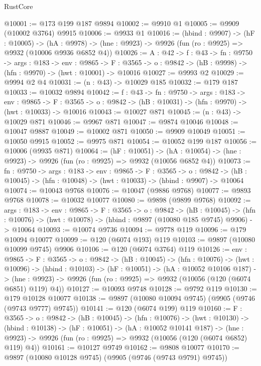 \begin{lexlean}{RustCore}
\begin{coremodule}
@10001 := @173 @199 @187 @9894
@10002 := @9910 @1
@10005 := @9909 (@10002 @3764) @9915
@10006 := @9933 @1
@10016 := (hbind : @9907) ->
  (hF : @10005) ->
  (hA : @9978) -> (hne : @9923) -> @9926 (fun (ro : @9925) => @9932 (@10006 @9936 @6852 @4))
@10026 := {A : @42} ->
  {f : @43} ->
  {fn : @9750} ->
  {args : @183} ->
  {env : @9865} ->
  {F : @3565} -> {o : @9842} -> (hB : @9998) -> (hfn : @9970) -> (hwt : @10001) -> @10016
@10027 := @9993 @2
@10029 := @9994 @2 @4
@10031 := (n : @43) -> @10029 @185
@10032 := @179 @187
@10033 := @10032 @9894
@10042 := {f : @43} ->
  {fn : @9750} ->
  {args : @183} ->
  {env : @9865} ->
  {F : @3565} -> {o : @9842} -> (hB : @10031) -> (hfn : @9970) -> (hwt : @10033) -> @10016
@10043 := @10027 @871
@10045 := (n : @43) -> @10029 @871
@10046 := @9967 @871
@10047 := @9874 @10046
@10048 := @10047 @9887
@10049 := @10002 @871
@10050 := @9909 @10049
@10051 := @10050 @9915
@10052 := @9975 @871
@10054 := @10052 @199 @187
@10056 := @10006 (@9935 @871)
@10064 := (hF : @10051) ->
  (hA : @10054) -> (hne : @9923) -> @9926 (fun (ro : @9925) => @9932 (@10056 @6852 @4))
@10073 := {fn : @9750} ->
  {args : @183} ->
  {env : @9865} ->
  {F : @3565} ->
  {o : @9842} -> (hB : @10045) -> (hfn : @10048) -> (hwt : @10033) -> (hbind : @9907) -> @10064
@10074 := @10043 @9768
@10076 := @10047 (@9886 @9768)
@10077 := @9893 @9768
@10078 := @10032 @10077
@10080 := @9898 (@9899 @9768)
@10092 := {args : @183} ->
  {env : @9865} ->
  {F : @3565} ->
  {o : @9842} ->
  (hB : @10045) ->
  (hfn : @10076) -> (hwt : @10078) -> (hbind : @9897 (@10080 @185 @9745) @9906) -> @10064
@10093 := @10074 @9736
@10094 := @9778 @119
@10096 := @179 @10094 @10077
@10099 := @120 (@6074 @193) @119
@10103 := @9897 (@10080 @10099 @9745) @9906
@10106 := @120 (@6074 @3764) @119
@10126 := {env : @9865} ->
  {F : @3565} ->
  {o : @9842} ->
  (hB : @10045) ->
  (hfn : @10076) ->
  (hwt : @10096) ->
  (hbind : @10103) ->
  (hF : @10051) ->
  (hA : @10052 @10106 @187) ->
  (hne : @9923) -> @9926 (fun (ro : @9925) => @9932 (@10056 (@120 (@6074 @6851) @119) @4))
@10127 := @10093 @9748
@10128 := @9792 @119
@10130 := @179 @10128 @10077
@10138 := @9897 (@10080 @10094 @9745) (@9905 (@9746 (@9743 @9777) @9745))
@10141 := @120 (@6074 @199) @119
@10160 := {F : @3565} ->
  {o : @9842} ->
  (hB : @10045) ->
  (hfn : @10076) ->
  (hwt : @10130) ->
  (hbind : @10138) ->
  (hF : @10051) ->
  (hA : @10052 @10141 @187) ->
  (hne : @9923) -> @9926 (fun (ro : @9925) => @9932 (@10056 (@120 (@6074 @6852) @119) @4))
@10161 := @10127 @9749
@10162 := @9808 @10077
@10170 := @9897 (@10080 @10128 @9745) (@9905 (@9746 (@9743 @9791) @9745))

\end{coremodule}
\end{lexlean}
